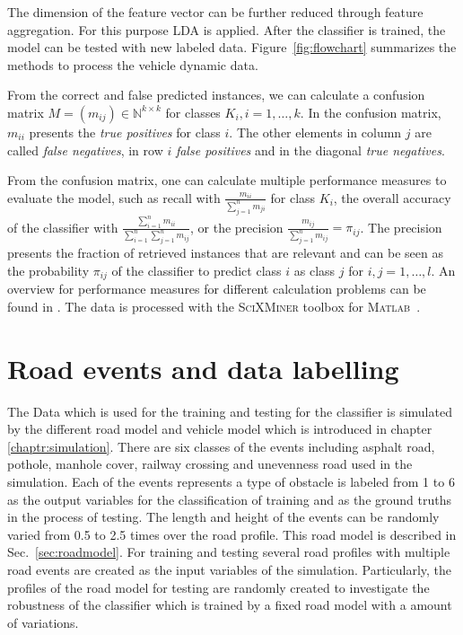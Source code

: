 The dimension of the feature vector can be further reduced through feature aggregation.
%
For this purpose \ac{LDA} is applied.
%
After the classifier is trained, the model can be tested with new labeled data.
%
Figure~\ref{fig:flowchart} summarizes the methods to process the vehicle dynamic data.

From the correct and false predicted instances, we can calculate a confusion matrix $M=(m_{ij})\in \mathbb{N}^{k \times k}$ for classes $K_i, i=1,\dotsc,k$.
%
In the confusion matrix, $m_{ii}$ presents the \textit{true positives} for class $i$. 
%
The other elements in column $j$ are called \textit{false negatives}, in row $i$ \textit{false positives} and in the diagonal \textit{true negatives}. 

From the confusion matrix, one can calculate multiple performance measures to evaluate the model, such as recall with $\frac{m_{ii}}{\sum_{j=1}^n{m_{ji}}}$ for class $K_i$, the overall accuracy of the classifier with $\frac{\sum_{i=1}^n{m_{ii}}}{\sum_{i=1}^n\sum_{j=1}^n{m_{ij}}}$, or the precision $\frac{m_{ij}}{\sum_{j=1}^n{m_{ij}}} = \pi_{ij}$. 
%
The precision presents the fraction of retrieved instances that are relevant and can be seen as the probability $\pi_{ij}$ of the classifier to predict class $i$ as class $j$ for $i,j=1,\dotsc,l$.
%
An overview for performance measures for different calculation problems can be found in \cite{Sokolova2009427}.
%
The data is processed with the \textsc{SciXMiner} toolbox for \textsc{Matlab}~\cite{mikut2017matlab}.




 
 \section{Road events and data labelling}
 
 The Data which is used for the training and testing for the classifier is simulated by the different road model and vehicle model which is introduced in chapter \ref{chaptr:simulation}.
 There are six classes of the events including asphalt road, pothole, manhole cover, railway crossing and unevenness road used in the simulation.
 Each of the events represents a type of obstacle is labeled from 1 to 6 as the output variables for the classification of training and as the ground truths in the process of testing.
 The length and height of the events can be randomly varied from 0.5 to 2.5 times over the road profile.
 This road model is described in Sec.~\ref{sec:roadmodel}.
 For training and testing several road profiles with multiple road events are created as the input variables of the simulation.
 Particularly, the profiles of the road model for testing are randomly created to investigate the robustness of the classifier which is trained by a fixed road model with a amount of variations.





